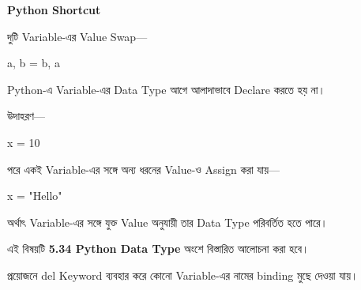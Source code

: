\begin{rememberbox}

\textbf{\color{deepOrange}Python Shortcut}

দুটি Variable-এর Value Swap—

\begin{center}

\textenglish{\ttfamily a, b = b, a}

\end{center}

\end{rememberbox}



Python-এ Variable-এর Data Type আগে আলাদাভাবে Declare
করতে হয় না।

উদাহরণ—

\begin{codebox}

\begin{english}
\ttfamily
x = 10
\end{english}

\end{codebox}

পরে একই Variable-এর সঙ্গে অন্য ধরনের Value-ও Assign করা যায়—

\begin{codebox}

\begin{english}
\ttfamily
x = "Hello"
\end{english}

\end{codebox}

অর্থাৎ Variable-এর সঙ্গে যুক্ত Value অনুযায়ী তার Data Type
পরিবর্তিত হতে পারে।

\begin{rememberbox}

এই বিষয়টি
\textbf{5.34 Python Data Type}
অংশে বিস্তারিত আলোচনা করা হবে।

\end{rememberbox}



প্রয়োজনে
\textenglish{\ttfamily del}
Keyword ব্যবহার করে কোনো Variable-এর নামের binding
মুছে দেওয়া যায়।

